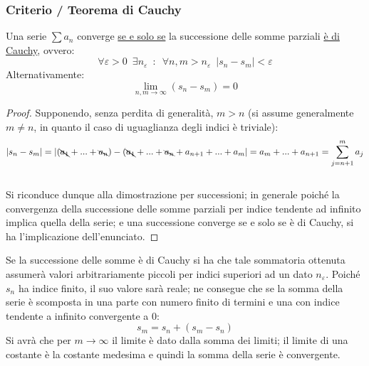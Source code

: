 \documentclass[10pt]{article}
\theoremstyle{plain}
\begin{document}
\subsubsection{Criterio / Teorema di Cauchy}
\begin{ther}
Una serie $\sum a_n$ converge \underline{se e solo se} la successione delle somme parziali \underline{è di Cauchy}, ovvero:
\[\forall \varepsilon > 0 \enspace \exists n_\varepsilon \enspace : \enspace \forall n, m >  n_\varepsilon \enspace |s_n - s_m| < \varepsilon\]
Alternativamente:
\[\lim \limits_{n,m \rightarrow \infty} (s_n - s_m) = 0\]
\end{ther}
\begin{proof}
Supponendo, senza perdita di generalità, $m > n$ (si assume generalmente $m \neq n$, in quanto il caso di uguaglianza degli indici è triviale):
\[|s_n - s_m| = |(\bcancel{a_1} + ... + \bcancel{a_n}) - (\bcancel{a_1} + ... + \bcancel{a_n} + a_{n+1} + ... + a_m| = a_m + ... + a_{n + 1} = \sum \limits_{j = n + 1}^{m} a_j\]
\\Si riconduce dunque alla dimostrazione per successioni; in generale poiché la convergenza della successione delle somme parziali per indice tendente ad infinito implica quella della serie; e una successione converge se e solo se è di Cauchy, si ha l'implicazione dell'enunciato.
\end{proof}
\begin{oss}
Se la successione delle somme è di Cauchy si ha che tale sommatoria ottenuta assumerà valori arbitrariamente piccoli per indici superiori ad un dato $n_\varepsilon$. Poiché $s_n$ ha indice finito, il suo valore sarà reale; ne consegue che se la somma della serie è scomposta in una parte con numero finito di termini e una con indice tendente a infinito convergente a 0:
\[s_m = s_n + (s_m - s_n)\]
Si avrà che per $m \rightarrow \infty$ il limite è dato dalla somma dei limiti; il limite di una costante è la costante medesima e quindi la somma della serie è convergente.
\end{oss}
\end{document}
